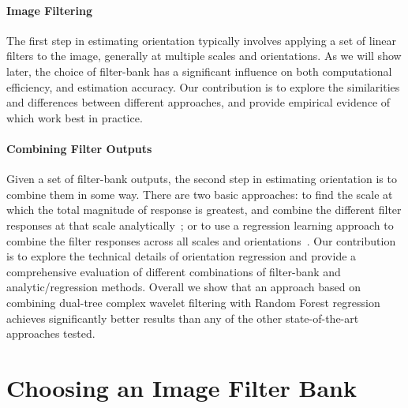 \documentclass[10pt,twocolumn,letterpaper]{article}
\def\dtcwt{DT-$\mathbb{C}$WT}
\newcommand{\comment}[1]{}
\begin{document}
\paragraph{Image Filtering}
The first step in estimating orientation typically involves applying a set of linear filters to the image, generally at multiple scales and orientations. As we will show later, the choice of filter-bank has a significant influence on both computational efficiency, and estimation accuracy. Our contribution is to explore the similarities and differences between different approaches, and provide empirical evidence of which work best in practice.

\paragraph{Combining Filter Outputs}
Given a set of filter-bank outputs, the second step in estimating orientation is to combine them in some way. There are two basic approaches: to find the scale at which the total magnitude of response is greatest, and combine the different filter responses at that scale analytically~\cite{Karssemeijer_teBrake_TMI96,Mei_etal_IVC09}; or to use a regression learning approach to combine the filter responses across all scales and orientations~\cite{Berks_etal_IPMI11}. Our contribution is to explore the technical details of orientation regression and provide a comprehensive evaluation of different combinations of filter-bank and analytic/regression methods. Overall we show that an approach based on combining dual-tree complex wavelet filtering with Random Forest regression achieves significantly better results than any of the other state-of-the-art approaches tested. \comment{Whilst combining the \dtcwt~ and Random Forests has previously been proposed for line detection, classification and orientation estimation in mammograms \cite{Chen_etal_IWDM10, Berks_etal_IPMI11}, we are not aware of any thorough presentation of the theoretical grounding for their use as orientation estimators. Additionally, we note that the description of orientation regression in \cite{Berks_etal_IPMI11} does not describe the modifications necessary to produce sensible splitting criteria for circular data. This paper significantly adds to the empirical evidence whilst also contributing the theoretical and technical information required to expand the method general data.}


\section{Choosing an Image Filter Bank}
\end{document}

